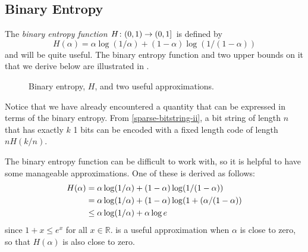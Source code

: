 \documentclass{patmorin}
\begin{document}
\subsection{Binary Entropy}

The \emph{binary entropy function} $H\colon (0,1)\to(0,1]$ is defined by
\[
    H(\alpha) = \alpha\log(1/\alpha) + (1-\alpha)\log(1/(1-\alpha)) 
\]
and will be quite useful.  The binary entropy function and two upper
bounds on it that we derive below are illustrated in .

\begin{figure}
  \caption{Binary entropy, $H$, and two useful approximations.}
\end{figure}

Notice that we have already encountered a quantity that can be
expressed in terms of the binary entropy.  From
\eqref{sparse-bitstring-ii}, a bit string of length $n$ that has
exactly $k$ 1 bits can be encoded with a fixed length code of length
$nH(k/n)$.

The binary entropy function can be difficult to work with, so it is
helpful to have some manageable approximations.  One of these is derived
as follows:
\begin{align}
  H(\alpha) & = \alpha\log(1/\alpha) + (1-\alpha)\log(1/(1-\alpha)) \notag \\
       & = \alpha\log(1/\alpha) + (1-\alpha)\log(1+(\alpha/(1-\alpha)) \notag \\
       & \le \alpha\log(1/\alpha) + \alpha\log e \eqlabel{entropy-i} 
\end{align}
since $1+x\le e^x$ for all $x\in\mathbb{R}$.  is a
useful approximation when $\alpha$ is close to zero, so that $H(\alpha)$ is also
close to zero.
\end{document}
